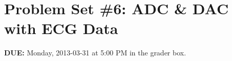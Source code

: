 


\section*{Problem Set \#6: ADC \& DAC with ECG Data}
{\bf DUE:} Monday, 2013-03-31 at 5:00 PM in the grader box.

\begin{enumerate}






\end{enumerate}


